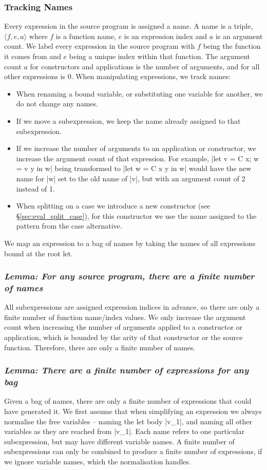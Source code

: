 \documentclass[draft]{sigplanconf}
\newcommand{\name}[3]{\ensuremath{\langle\mathsf{#1},\mathsf{#2},\mathsf{#3}\rangle}}
\newcommand{\lemma}[1]{\subsubsection*{\textit{Lemma: #1}}}
\begin{document}
\subsubsection{Tracking Names}

Every expression in the source program is assigned a name. A name is a triple, \name{\mathit{f}}{\mathit{e}}{\mathit{a}} where $f$ is a function name, $e$ is an expression index and $a$ is an argument count. We label every expression in the source program with $f$ being the function it comes from and $e$ being a unique index within that function. The argument count $a$ for constructors and applications is the number of arguments, and for all other expressions is 0. When manipulating expressions, we track names:

\begin{itemize}
\item When renaming a bound variable, or substituting one variable for another, we do not change any names.
\item If we move a subexpression, we keep the name already assigned to that subexpression.
\item If we increase the number of arguments to an application or constructor, we increase the argument count of that expression. For example, |let v = C x; w = v y in w| being transformed to |let w = C x y in w| would have the new name for |w| set to the old name of |v|, but with an argument count of 2 instead of 1.
\item When splitting on a case we introduce a new constructor (see \S\ref{sec:eval_split_case}), for this constructor we use the name assigned to the pattern from the case alternative.
\end{itemize}

We map an expression to a bag of names by taking the names of all expressions bound at the root let.

\lemma{For any source program, there are a finite number of names}

All subexpressions are assigned expression indices in advance, so there are only a finite number of function name/index values. We only increase the argument count when increasing the number of arguments applied to a constructor or application, which is bounded by the arity of that constructor or the source function. Therefore, there are only a finite number of names.

\lemma{There are a finite number of expressions for any bag}

Given a bag of names, there are only a finite number of expressions that could have generated it. We first assume that when simplifying an expression we always normalise the free variables -- naming the let body |v_1|, and naming all other variables as they are reached from |v_1|. Each name refers to one particular subexpression, but may have different variable names. A finite number of subexpressions can only be combined to produce a finite number of expressions, if we ignore variable names, which the normalisation handles.
\end{document}

